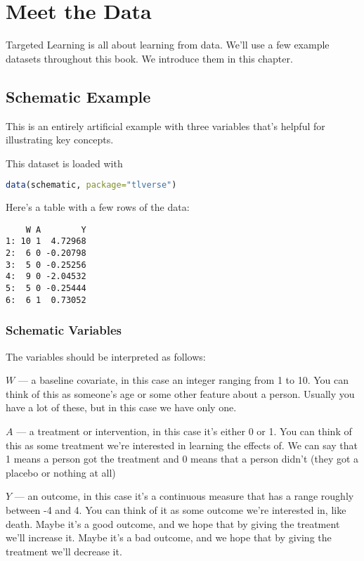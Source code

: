 \documentclass[
  12pt, krantz2,
]{krantz}
\theoremstyle{definition}
\theoremstyle{definition}
\theoremstyle{definition}
\newcommand{\1}{\mathbbm{1}}
\begin{document}
\hypertarget{data}{%
\chapter{Meet the Data}\label{data}}

Targeted Learning is all about learning from data. We'll use a few example datasets throughout this book. We introduce them in this chapter.

\hypertarget{data-schematic}{%
\section{Schematic Example}\label{data-schematic}}

This is an entirely artificial example with three variables that's helpful for illustrating key concepts.

This dataset is loaded with

\begin{lstlisting}[language=R]
data(schematic, package="tlverse")
\end{lstlisting}

Here's a table with a few rows of the data:

\begin{lstlisting}
    W A        Y
1: 10 1  4.72968
2:  6 0 -0.20798
3:  5 0 -0.25256
4:  9 0 -2.04532
5:  5 0 -0.25444
6:  6 1  0.73052
\end{lstlisting}

\hypertarget{schematic-variables}{%
\subsection{Schematic Variables}\label{schematic-variables}}

The variables should be interpreted as follows:

\(W\) --- a baseline covariate, in this case an integer ranging from 1 to 10. You can think of this as someone's age or some other feature about a person. Usually you have a lot of these, but in this case we have only one.

\(A\) --- a treatment or intervention, in this case it's either 0 or 1. You can think of this as some treatment we're interested in learning the effects of. We can say that 1 means a person got the treatment and 0 means that a person didn't (they got a placebo or nothing at all)

\(Y\) --- an outcome, in this case it's a continuous measure that has a range roughly between -4 and 4. You can think of it as some outcome we're interested in, like death. Maybe it's a good outcome, and we hope that by giving the treatment we'll increase it. Maybe it's a bad outcome, and we hope that by giving the treatment we'll decrease it.
\end{document}
